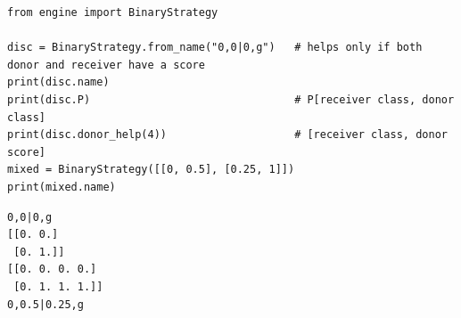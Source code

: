 \begin{lstlisting}[style=code]
from engine import BinaryStrategy

disc = BinaryStrategy.from_name("0,0|0,g")   # helps only if both donor and receiver have a score
print(disc.name)
print(disc.P)                                # P[receiver class, donor class]
print(disc.donor_help(4))                    # [receiver class, donor score]
mixed = BinaryStrategy([[0, 0.5], [0.25, 1]])
print(mixed.name)
\end{lstlisting}
\begin{lstlisting}[style=output]
0,0|0,g
[[0. 0.]
 [0. 1.]]
[[0. 0. 0. 0.]
 [0. 1. 1. 1.]]
0,0.5|0.25,g
\end{lstlisting}
